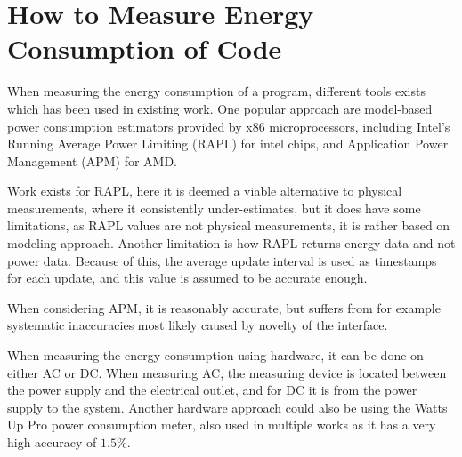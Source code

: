 
\section{How to Measure Energy Consumption of Code}

When measuring the energy consumption of a program, different tools exists which has been used in existing work. One popular approach are model-based power consumption estimators provided by x86 microprocessors, including Intel's Running Average Power Limiting (RAPL) for intel chips, and Application Power Management (APM) for AMD.

Work exists for RAPL, here it is deemed a viable alternative to physical measurements, where it consistently under-estimates\cite[]{Dongarra2012, Hackenberg2013}, but it does have some limitations, as RAPL values are not physical measurements, it is rather based on modeling approach\cite[]{Hackenberg2013}. Another limitation is how RAPL returns energy data and not power data. Because of this, the average update interval is used as timestamps for each update, and this value is assumed to be accurate enough.\cite[]{Hackenberg2013}

When considering APM, it is reasonably accurate, but suffers from for example systematic inaccuracies most likely caused by novelty of the interface.\cite[]{Hackenberg2013}


When measuring the energy consumption using hardware, it can be done on either AC or DC. When measuring AC, the measuring device is located between the power supply and the electrical outlet, and for DC it is from the power supply to the system.\cite*[]{Hackenberg2013} Another hardware approach could also be using the Watts Up Pro power consumption meter, also used in multiple works as it has a very high accuracy of $1.5\%$.\cite[]{Jagroep2015}

